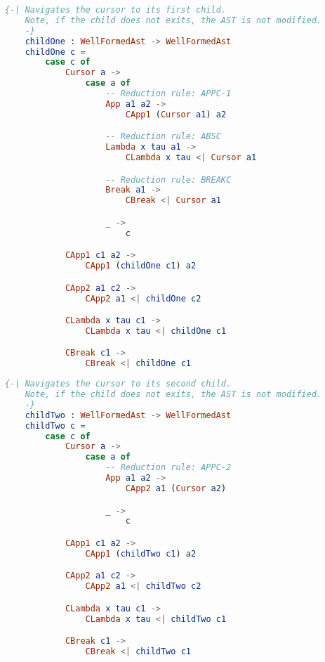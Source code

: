 \begin{lstlisting}[language=elm,%
                   label=childOne-function,%
                   caption="The Ast.childOne function.",%
                   gobble=4,%
                   ]
    {-| Navigates the cursor to its first child.
    Note, if the child does not exits, the AST is not modified.
    -}
    childOne : WellFormedAst -> WellFormedAst
    childOne c =
        case c of
            Cursor a ->
                case a of
                    -- Reduction rule: APPC-1
                    App a1 a2 ->
                        CApp1 (Cursor a1) a2

                    -- Reduction rule: ABSC
                    Lambda x tau a1 ->
                        CLambda x tau <| Cursor a1

                    -- Reduction rule: BREAKC
                    Break a1 ->
                        CBreak <| Cursor a1

                    _ ->
                        c

            CApp1 c1 a2 ->
                CApp1 (childOne c1) a2

            CApp2 a1 c2 ->
                CApp2 a1 <| childOne c2

            CLambda x tau c1 ->
                CLambda x tau <| childOne c1

            CBreak c1 ->
                CBreak <| childOne c1
\end{lstlisting}

\begin{lstlisting}[language=elm,%
                   label=childTwo-function,%
                   caption="The Ast.childTwo function.",%
                   gobble=4,%
                   ]
    {-| Navigates the cursor to its second child.
    Note, if the child does not exits, the AST is not modified.
    -}
    childTwo : WellFormedAst -> WellFormedAst
    childTwo c =
        case c of
            Cursor a ->
                case a of
                    -- Reduction rule: APPC-2
                    App a1 a2 ->
                        CApp2 a1 (Cursor a2)

                    _ ->
                        c

            CApp1 c1 a2 ->
                CApp1 (childTwo c1) a2

            CApp2 a1 c2 ->
                CApp2 a1 <| childTwo c2

            CLambda x tau c1 ->
                CLambda x tau <| childTwo c1

            CBreak c1 ->
                CBreak <| childTwo c1
\end{lstlisting}

